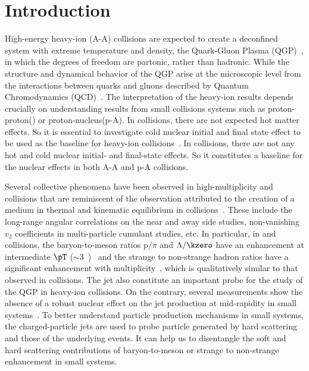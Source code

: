 
\section{Introduction}%
\label{sec:Introduction}

High-energy heavy-ion (A-A) collisions are expected to create a deconfined system with extreme temperature and density, the Quark-Gluon Plasma (QGP)~\cite{Rafelski:126179, Satz:2000bn, Shuryak:1983ni, Jacak:2012dx, Cleymans:1985wb, Bass:1998vz, BraunMunzinger:2007zz}, in which the degrees of freedom are partonic, rather than hadronic.
While the structure and dynamical behavior of the QGP arise at the microscopic level from the interactions between quarks and gluons described by Quantum Chromodynamics (QCD)~\cite{Laermann:2003cv, Gupta:2011wh, Bhattacharya:2014ara}.
The interpretation of the heavy-ion results depends crucially on understanding results from small collisions systems such as proton-proton(\pp) or proton-nucleus(p-A).
In \pPb collisions, there are not expected hot matter effects.
So it is essential to investigate cold nuclear initial and final state effect to be used as the baseline for heavy-ion collisions~\cite{Salgado:2011wc, Eskola:2016oht}.
In \pp collisions, there are not any hot and cold nuclear initial- and final-state effects.
So it constitutes a baseline for the nuclear effects in both A-A and p-A collisions.

Several collective phenomena have been observed in high-multiplicity \pp and \pPb collisions that are reminiscent of the observation attributed to the creation of a medium in thermal and kinematic equilibrium in \PbPb collisions~\cite{Acharya:2019vdf, Aad:2015gqa, Abelev:2012ola, ABELEV:2013wsa, Khachatryan:2015waa, Abelev:2014uua, Adam:2015vsf}.
These include the long-range angular correlations on the near and away side studies, non-vanishing $v_{2}$ coefficients in multi-particle cumulant studies, etc.
In particular, in \pp and \pPb collisions, the baryon-to-meson ratios p$/\pi$ and $\Lambda/\kzero$ have an enhancement at intermediate $\pT$ ($\sim 3$~\GeVc)~\cite{Acharya:2018orn, Khachatryan:2016yru, Abelev:2013xaa, ALICE:2017jyt} and the strange to non-strange hadron ratios have a significant enhancement with multiplicity~\cite{Abelev:2013haa, ALICE:2017jyt, Khachatryan:2016yru}, which is qualitatively similar to that observed in \PbPb collisions.
The jet also constitute an important probe for the study of the QGP in heavy-ion collisions. 
On the contrary, several measurements show the absence of a robust nuclear effect on the jet production at mid-rapidity in small systems~\cite{Acharya:2019jyg, Acharya:2019tku, ALICE:2014dla, Abelev:2013fn, Acharya:2018eat, Acharya:2017okq, Adam:2015xea, Adam:2016jfp}.
To better understand particle production mechanisms in small systems, the charged-particle jets are used to probe particle generated by hard scattering and those of the underlying events.
It can help us to disentangle the soft and hard scattering contributions of baryon-to-meson or strange to non-strange enhancement in small systems. 

